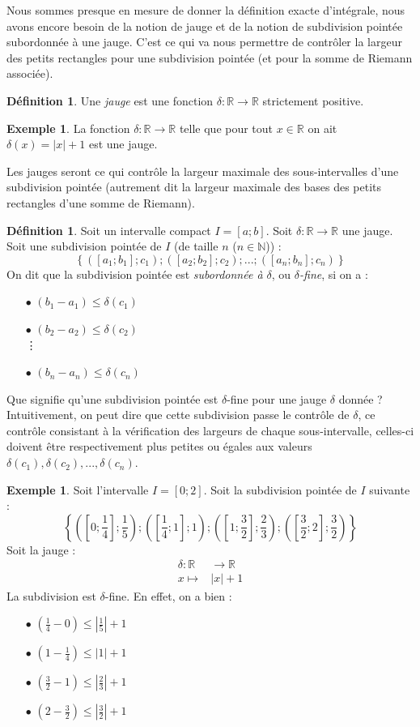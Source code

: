 \documentclass[a4paper,fontsize=13pt]{scrreprt}
\theoremstyle{plain}
\theoremstyle{definition}
\newtheorem{déf}[subsection]{Définition}
\newtheorem{exe}[subsection]{Exemple}
\newcommand{\nn}{\mathbb{N}}
\newcommand{\rr}{\mathbb{R}}
\begin{document}
Nous sommes presque en mesure de donner la définition exacte d'intégrale, nous avons encore besoin de la notion de jauge et de la notion de subdivision pointée subordonnée à une jauge. C'est ce qui va nous permettre de contrôler la largeur des petits rectangles pour une subdivision pointée (et pour la somme de Riemann associée).
\begin{déf}
Une \emph{jauge} est une fonction $\delta : \rr \to \rr$ strictement positive.
\end{déf}
\begin{exe}
La fonction $\delta : \rr \to \rr$ telle que pour tout $x \in \rr$ on ait $\delta(x) = |x|+1$ est une jauge.
\end{exe}
Les jauges seront ce qui contrôle la largeur maximale des sous-intervalles d'une subdivision pointée (autrement dit la largeur maximale des bases des petits rectangles d'une somme de Riemann). \newpage
\begin{déf}
Soit un intervalle compact $I = [a;b]$. Soit $\delta : \rr \to \rr$ une jauge. Soit une subdivision pointée de $I$ (de taille $n$ ($n \in \nn$)) :
$$\left\{([a_1;b_1];c_1);([a_2;b_2];c_2);...;([a_n;b_n];c_n)\right\}$$
On dit que la subdivision pointée est \emph{subordonnée à $\delta$}, ou \emph{$\delta$-fine}, si on a :
\begin{itemize}
\item [$\bullet$] $(b_1 -a_1) \le \delta(c_1)$
\item [$\bullet$] $(b_2 -a_2) \le \delta(c_2)$\\
\vdots
\item [$\bullet$] $(b_n -a_n) \le \delta(c_n)$
\end{itemize}
\end{déf}
Que signifie qu'une subdivision pointée est $\delta$-fine pour une jauge $\delta$ donnée ? Intuitivement, on peut dire que cette subdivision \og passe le contrôle \fg{} de $\delta$, ce contrôle consistant à la vérification des largeurs de chaque sous-intervalle, celles-ci doivent être respectivement plus petites ou égales aux valeurs $\delta(c_1),\delta(c_2),...,\delta(c_n)$.
\begin{exe}
Soit l'intervalle $I = [0;2]$. Soit la subdivision pointée de $I$ suivante :
$$\left\{([0;\frac{1}{4}];\frac{1}{5});([\frac{1}{4};1];1);([1;\frac{3}{2}];\frac{2}{3});([\frac{3}{2};2];\frac{3}{2})\right\}$$
Soit la jauge :
\begin{align*}
\delta : \rr &\to \rr \\
x \mapsto & |x|+1
\end{align*}
La subdivision est $\delta$-fine. En effet, on a bien :
\begin{itemize}
\item [$\bullet$] $(\frac{1}{4} -0) \le |\frac{1}{5}|+1$
\item [$\bullet$] $(1-\frac{1}{4}) \le |1|+1$
\item [$\bullet$] $(\frac{3}{2} -1) \le |\frac{2}{3}|+1$
\item [$\bullet$] $(2 -\frac{3}{2}) \le |\frac{3}{2}|+1$
\end{itemize}
\end{exe}
\end{document}
